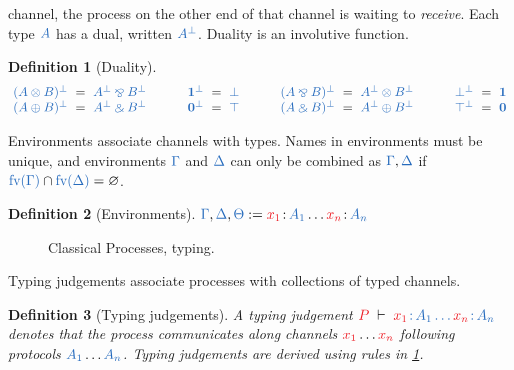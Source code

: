 \documentclass[draft,submission,copyright,creativecommons]{eptcs}
\newtheorem{definition}{Definition}
\begin{document}
channel, the process on the other end of that channel is waiting to
\emph{receive}.
Each type $\ty{A}$ has a dual, written $\ty{A^\bot}$.
Duality is an involutive function.
\begin{definition}[Duality]\label{def:cp-negation}
  \[
    \setlength{\arraycolsep}{3pt}
    \begin{array}{lclclclclclclcl}
               \ty{(A \tens B)^\bot} & = & \ty{A^\bot \parr B^\bot}
      &\qquad& \ty{\one^\bot}        & = & \ty{\bot}
      &\qquad& \ty{(A \parr B)^\bot} & = & \ty{A^\bot \tens B^\bot}
      &\qquad& \ty{\bot^\bot}        & = & \ty{\one}
      \\       \ty{(A \plus B)^\bot} & = & \ty{A^\bot \with B^\bot}
      &\qquad& \ty{\nil^\bot}        & = & \ty{\top}
      &\qquad& \ty{(A \with B)^\bot} & = & \ty{A^\bot \plus B^\bot}
      &\qquad& \ty{\top^\bot}        & = & \ty{\nil}
    \end{array}
  \]
\end{definition}\noindent
Environments associate channels with types.
Names in environments must be unique, and environments $\ty{\Gamma}$ and
$\ty{\Delta}$ can only be combined as $\ty{\Gamma}, \ty{\Delta}$ if
$\ty{\fv{\Gamma}} \cap \ty{\fv{\Delta}} = \varnothing$.
\begin{definition}[Environments]\label{def:cp-environments}
  \(
    \ty{\Gamma}, \ty{\Delta}, \ty{\Theta} := \tmty{x_1}{A_1}\dots\tmty{x_n}{A_n}
  \) 
\end{definition}\noindent
\begin{figure}
  \begin{center}\cpInfAx \cpInfCut \end{center}
  \vspace*{-.5\baselineskip}
  \begin{center}\cpInfTens \cpInfParr \cpInfOne \end{center}
  \vspace*{-.5\baselineskip}
  \begin{center}\cpInfBot {} \end{center}
  \vspace*{-.5\baselineskip}
  \begin{center}\cpInfWith \cpInfNil \cpInfTop \end{center}
  \caption{Classical Processes, typing.}
  \label{fig:cp}
\end{figure}\noindent
Typing judgements associate processes with collections of typed channels.
\begin{definition}[Typing judgements]\label{def:cp}
  A typing judgement $\seq[{ P }]{\tmty{x_1}{A_1}\dots\tmty{x_n}{A_n}}$ denotes
  that the process  communicates along channels $\tm{x_1}\dots\tm{x_n}$
  following protocols $\ty{A_1}\dots\ty{A_n}$.
  Typing judgements are derived using rules in \cref{fig:cp}.
\end{definition}\noindent
\end{document}
